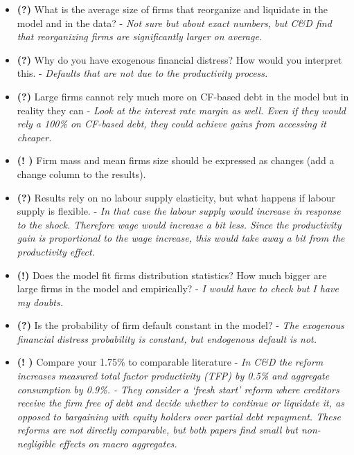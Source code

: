 \documentclass[12pt]{article}
\begin{document}
\begin{itemize}
    \item \textbf{(?)} What is the average size of firms that reorganize and liquidate in the model and in the data? - \textit{Not sure but about exact numbers, but C\&D find that reorganizing firms are significantly larger on average.}
    \item \textbf{(?)} Why do you have exogenous financial distress? How would you interpret this. - \textit{Defaults that are not due to the productivity process.}
    \item \textbf{(?)} Large firms cannot rely much more on CF-based debt in the model but in reality they can - \textit{Look at the interest rate margin as well. Even if they would rely a 100\% on CF-based debt, they could achieve gains from accessing it cheaper.}
    \item \textbf{(!  \checkmark)} Firm mass and mean firms size should be expressed as changes (add a change column to the results). 
    \item \textbf{(?)} Results rely on no labour supply elasticity, but what happens if labour supply is flexible. - \textit{In that case the labour supply would increase in response to the shock. Therefore wage would increase a bit less. Since the productivity gain is proportional to the wage increase, this would take away a bit from the productivity effect.}
    \item \textbf{(!)} Does the model fit firms distribution statistics? How much bigger are large firms in the model and empirically? - \textit{I would have to check but I have my doubts.}
    \item \textbf{(?)} Is the probability of firm default constant in the model? - \textit{The exogenous financial distress probability is constant, but endogenous default is not.}
    \item \textbf{(!  \checkmark)} Compare your 1.75\% to comparable literature - \textit{In C\&D the reform increases measured total factor productivity (TFP) by 0.5\% and aggregate consumption by 0.9\%. - They consider a `fresh start' reform where creditors receive the firm free of debt and decide whether to continue or liquidate it, as opposed to bargaining with equity holders over partial debt repayment. These reforms are not directly comparable, but both papers find small but non-negligible effects on macro aggregates.} 
    
    \bigskip


\end{itemize}
\end{document}
